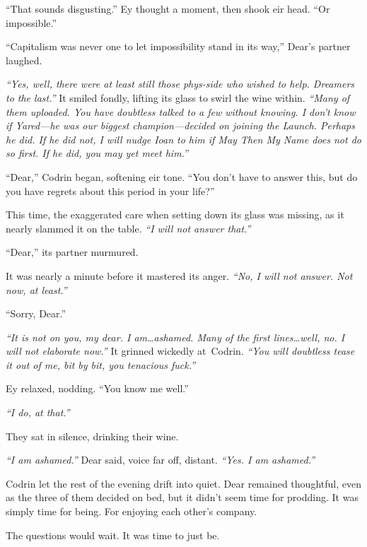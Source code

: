 ``That sounds disgusting.'' Ey thought a moment, then shook eir head. ``Or impossible.''

``Capitalism was never one to let impossibility stand in its way,'' Dear's partner laughed.

\emph{``Yes, well, there were at least still those phys-side who wished to help. Dreamers to the last.''} It smiled fondly, lifting its glass to swirl the wine within. \emph{``Many of them uploaded. You have doubtless talked to a few without knowing. I don't know if Yared---he was our biggest champion---decided on joining the Launch. Perhaps he did. If he did not, I will nudge Ioan to him if May Then My Name does not do so first. If he did, you may yet meet him.''}

``Dear,'' Codrin began, softening eir tone. ``You don't have to answer this, but do you have regrets about this period in your life?''

This time, the exaggerated care when setting down its glass was missing, as it nearly slammed it on the table. \emph{``I will not answer that.''}

``Dear,'' its partner murmured.

It was nearly a minute before it mastered its anger. \emph{``No, I will not answer. Not now, at least.''}

``Sorry, Dear.''

\emph{``It is not on you, my dear. I am\ldots ashamed. Many of the first lines\ldots well, no. I will not elaborate now.''} It grinned wickedly at\pagebreak\ Codrin. \emph{``You will doubtless tease it out of me, bit by bit, you tenacious fuck.''}

Ey relaxed, nodding. ``You know me well.''

\emph{``I do, at that.''}

They sat in silence, drinking their wine.

\emph{``I am ashamed.''} Dear said, voice far off, distant. \emph{``Yes. I am ashamed.''}

Codrin let the rest of the evening drift into quiet. Dear remained thoughtful, even as the three of them decided on bed, but it didn't seem time for prodding. It was simply time for being. For enjoying each other's company.

The questions would wait. It was time to just be.
